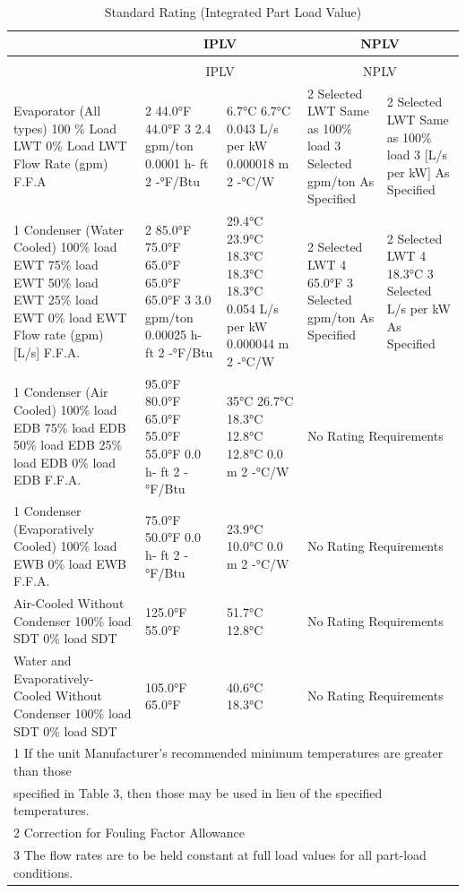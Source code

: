 \begin{longtable}[c]{p{1.2in}p{1.2in}p{1.2in}p{1.2in}p{1.2in}}
\caption{Standard Rating (Integrated Part Load Value) \label{table:standard-rating-integrated-part-load-value}} \tabularnewline
\toprule
 & \multicolumn{2}{c}{IPLV} & \multicolumn{2}{c}{NPLV} \tabularnewline
\midrule
\endfirsthead

\caption[]{Standard Rating (Integrated Part Load Value)} \tabularnewline
\toprule
 & \multicolumn{2}{c}{IPLV} & \multicolumn{2}{c}{NPLV} \tabularnewline
\midrule
\endhead

Evaporator (All types)  100 \% Load LWT  0\% Load LWT  Flow Rate (gpm)  F.F.A & 2 44.0°F  44.0°F  3 2.4 gpm/ton  0.0001  h- ft 2 -°F/Btu & 6.7°C  6.7°C  0.043 L/s per  kW  0.000018  m 2 -°C/W & 2 Selected LWT  Same as 100\%  load  3 Selected  gpm/ton  As Specified & 2 Selected  LWT  Same as 100\%  load  3 [L/s per kW]  As Specified \tabularnewline
1 Condenser (Water  Cooled)  100\% load EWT  75\% load EWT  50\% load EWT  25\% load EWT  0\% load EWT  Flow rate (gpm) [L/s]  F.F.A. & 2 85.0°F  75.0°F  65.0°F  65.0°F  65.0°F  3 3.0 gpm/ton  0.00025  h- ft 2 -°F/Btu & 29.4°C  23.9°C  18.3°C  18.3°C  18.3°C  0.054 L/s per  kW  0.000044  m 2 -°C/W & 2 Selected LWT  4 65.0°F  3 Selected  gpm/ton  As Specified & 2 Selected LWT  4 18.3°C  3 Selected  L/s per kW  As Specified \tabularnewline
1 Condenser (Air Cooled)  100\% load EDB  75\% load EDB  50\% load EDB  25\% load EDB  0\% load EDB  F.F.A. & 95.0°F  80.0°F  65.0°F  55.0°F  55.0°F  0.0 h- ft 2  -°F/Btu & 35°C  26.7°C  18.3°C  12.8°C  12.8°C  0.0 m 2 -°C/W & \multicolumn{2}{l}{No Rating Requirements} \tabularnewline
1 Condenser  (Evaporatively Cooled)  100\% load EWB  0\% load EWB  F.F.A. & 75.0°F  50.0°F  0.0 h- ft 2  -°F/Btu & 23.9°C  10.0°C  0.0 m 2 -°C/W & \multicolumn{2}{l}{No Rating Requirements} \tabularnewline
Air-Cooled Without  Condenser  100\% load SDT  0\% load SDT & 125.0°F  55.0°F & 51.7°C  12.8°C & \multicolumn{2}{l}{No Rating Requirements} \tabularnewline
Water and Evaporatively-  Cooled Without  Condenser  100\% load SDT  0\% load SDT & 105.0°F  65.0°F & 40.6°C  18.3°C & \multicolumn{2}{l}{No Rating Requirements} \tabularnewline
\bottomrule
\multicolumn{5}{l}{1 If the unit Manufacturer’s recommended minimum temperatures are greater than those} \tabularnewline
\multicolumn{5}{l}{specified in  Table 3, then those may be used in lieu of the specified temperatures.} \tabularnewline
\multicolumn{5}{l}{2 Correction for Fouling Factor Allowance} \tabularnewline
\multicolumn{5}{l}{3 The flow rates are to be held constant at full load values for all part-load conditions.} \tabularnewline

\end{longtable}
